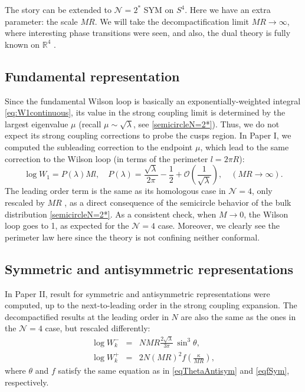 The story can be extended to $\mathcal{N}=2^*$ SYM on $S^4$.
Here we have an extra parameter: the scale $MR$.
We will take the decompactification limit $MR \rightarrow \infty$, where interesting phase transitions were seen, 
and also, the dual theory is fully known on $\mathbb{R}^4$ \cite{Pilch:2000ue}.



\subsection{Fundamental representation}

Since the fundamental Wilson loop is basically an exponentially-weighted integral \eqref{eq:W1continuous},
its value in the strong coupling limit is determined by the largest eigenvalue $\mu$
(recall $\mu\sim\sqrt{\lambda}$, see \eqref{semicircleN=2*}). 
Thus, we do not expect its strong coupling corrections to probe the cusps region.
In Paper I, we computed the subleading correction to the endpoint $\mu$,
which lead to the same correction to the Wilson loop (in terms of the perimeter $l=2\pi R$):
\begin{equation}\label{WLFundN2}
 \log W_1= P(\lambda) Ml, \quad P(\lambda) = \frac{\sqrt{\lambda}}{2 \pi} -\frac{1}{2} + \mathcal{O}\left(\dfrac{1}{\sqrt{\lambda}}\right), 
 \quad (MR\rightarrow \infty).
\end{equation}
The leading order term is the same as its homologous case in $\mathcal{N}=4$, only rescaled by $MR$ \cite{Buchel:2013id},
as a direct consequence of the semicircle behavior of the bulk distribution \eqref{semicircleN=2*}.
As a consistent check, when $M\rightarrow 0$, the Wilson loop goes to 1, as expected for the $\mathcal{N}=4$ case.
Moreover, we clearly see the perimeter law here since the theory is not confining neither conformal.



\subsection{Symmetric and antisymmetric representations}
In Paper II, result for symmetric and antisymmetric representations were computed,
up to the next-to-leading order in the strong coupling expansion.
The decompactified results at the leading order in $N$ are also the same as the ones in the $\mathcal{N}=4$ case,
but rescaled differently:
\begin{eqnarray}
 \log W_{k}^- &=& N M R\frac{2\sqrt{\lambda }}{3\pi}\,\sin^3\theta,\\
 \log W_{k}^+ &=& 2 N (MR)^2 f\left(\frac{\kappa}{M R}\right),
\end{eqnarray}
where $\theta$ and  $f$ satisfy the same equation as in \eqref{eqThetaAntisym} and \eqref{eqfSym}, respectively.

